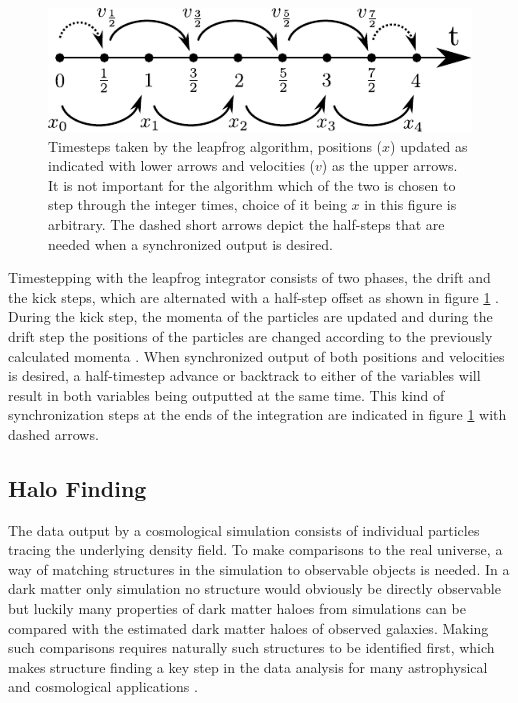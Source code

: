 \documentclass[english, oneside]{HYgradu}
\begin{document}
\begin{figure}
\centering
\includegraphics{kuvat/tex/leapfrog.pdf}
\caption{Timesteps taken by the leapfrog algorithm, positions ($x$) updated as indicated with lower arrows and velocities ($v$) as the upper arrows. It is not important for the algorithm which of the two is chosen to step through the integer times, choice of it being $x$ in this figure is arbitrary. The dashed short arrows depict the half-steps that are needed when a synchronized output is desired.}\label{fig:leapfrog}
\end{figure}

Timestepping with the leapfrog integrator consists of two phases, the drift and the kick steps, which are alternated with a half-step offset as shown in figure \ref{fig:leapfrog} \citep{binney2008galactic}. During the kick step, the momenta of the particles are updated and during the drift step the positions of the particles are changed according to the previously calculated momenta \citep{binney2008galactic}. When synchronized output of both positions and velocities is desired, a half-timestep advance or backtrack to either of the variables will result in both variables being outputted at the same time. This kind of synchronization steps at the ends of the integration are indicated in figure \ref{fig:leapfrog} with dashed arrows.




\subsection{Halo Finding} \label{sect:halofinding}
The data output by a cosmological simulation consists of individual particles tracing the underlying density field. To make comparisons to the real universe, a way of matching structures in the simulation to observable objects is needed. In a dark matter only simulation no structure would obviously be directly observable but luckily many properties of dark matter haloes from simulations can be compared with the estimated dark matter haloes of observed galaxies. %
Making such comparisons requires naturally such structures to be identified first, which makes structure finding a key step in the data analysis for many astrophysical and cosmological applications \citep{knebe2013structure}.
\end{document}
